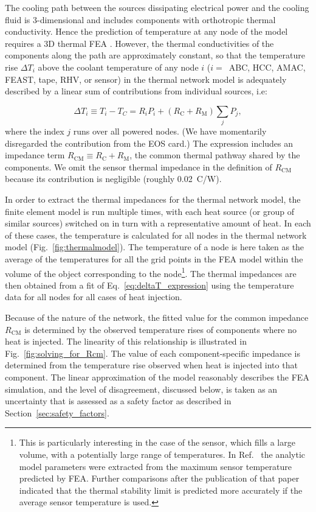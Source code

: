 \label{sec:impedances}

The cooling path between the sources dissipating electrical power and the cooling fluid is 3-dimensional and includes components with orthotropic thermal conductivity. Hence the prediction of temperature at any node of the model requires a 3D thermal FEA \cite{abaqus,ansys}. However, the thermal conductivities of the components along the path are approximately constant, so that the temperature rise $\Delta T_i$ above the coolant temperature of any node $i$ ($i=$~ABC, HCC, AMAC, FEAST, tape, RHV, or sensor) in the thermal network model is adequately described by a linear sum of contributions from individual sources, i.e:

\begin{equation}
\Delta T_i \equiv T_i - T_C = R_i P_i + \left(R_\text{C} + R_\text{M}\right)\sum_j P_j,
\label{eq:deltaT_expression}
\end{equation}
where the index $j$ runs over all powered nodes. (We have momentarily disregarded the contribution from the EOS card.)
The expression includes an impedance term $R_\text{CM} \equiv R_\text{C} + R_\text{M}$, the common thermal pathway shared
by the components. We omit the sensor thermal impedance in the definition of $R_\text{CM}$ because its contribution
is negligible (roughly 0.02~C/W).

In order to extract the thermal impedances for the thermal network model, the finite element model is run multiple times, with each heat source (or group of similar sources) switched on in turn with a representative amount of heat. In each of these cases, the temperature is calculated for all nodes in the thermal network model (Fig.~\ref{fig:thermalmodel}). The temperature of a node is here taken as the average of the temperatures for all the grid points in the FEA model within the volume of the object corresponding to the node\footnote{This is particularly interesting in the case of the sensor, which fills a large volume, with a potentially large range of temperatures. In Ref.~\cite{Beck:2010zzd} the analytic model parameters were extracted from the maximum sensor temperature predicted by FEA. Further comparisons after the publication of that paper indicated that the thermal stability limit is predicted more accurately if the average sensor temperature is used.}. The thermal impedances are then obtained from a fit of Eq.~\ref{eq:deltaT_expression} using the temperature data for all nodes for all cases of heat injection.

Because of the nature of the network, the fitted value for the common impedance $R_\text{CM}$ is determined by the observed temperature rises of components where no heat is injected. The linearity of this relationship is illustrated in Fig.~\ref{fig:solving_for_Rcm}. The value of each component-specific impedance is determined from the temperature rise observed when heat is injected into that component. The linear approximation of the model reasonably describes the FEA simulation, and the level of disagreement, discussed below, is taken as an uncertainty that is assessed as a safety factor as described in Section~\ref{sec:safety_factors}.


